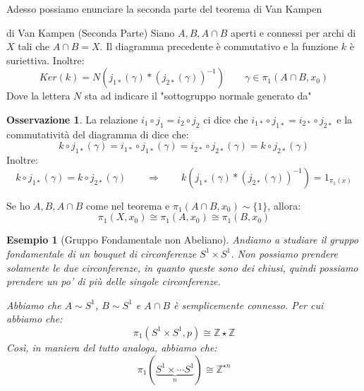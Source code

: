 \documentclass[11pt,a4paper,twoside]{article}
\newtheorem{es}{Esempio}
\theoremstyle{definition}
\newtheorem*{oss}{Osservazione}
\begin{document}
Adesso possiamo enunciare la seconda parte del teorema di Van Kampen

\begin{thm}{di Van Kampen (Seconda Parte)}{}\label{VK2}
	Siano $A,B,A\cap B$ aperti e connessi per archi di $X$ tali che $A \cap B = X$. Il diagramma precedente è commutativo e la funzione $k$ è suriettiva. Inoltre:
	\[ Ker(k) = N(j_{1*}(\gamma) * (j_{2*}(\gamma))^{-1})\qquad \gamma \in \pi_1(A \cap B, x_0) \]
	Dove la lettera $N$ sta ad indicare il "sottogruppo normale generato da"
\end{thm}

\begin{oss}
	La relazione $i_1\circ j_1 =i_2 \circ j_2$ ci dice che $i_{1*} \circ j_{1*} = i_{2*} \circ j_{2*}$ e la commutatività del diagramma di dice che:
	\[ k \circ j_{1*}(\gamma) = i_{1*} \circ j_{1*}(\gamma) = i_{2*} \circ j_{2*} (\gamma) = k \circ j_{2*}(\gamma) \]
	Inoltre:
	\[ k \circ j_{1*}(\gamma) = k \circ j_{2*}(\gamma) \qquad \Rightarrow \qquad k(j_{1*}(\gamma) * (j_{2*}(\gamma))^{-1}) = 1_{\pi_1(x)} \]
\end{oss}

\begin{cor}{}{}
	Se ho $A,B,A \cap B$ come nel teorema e $\pi_1(A \cap B, x_0) \sim \{1\}$, allora:
	\[ \pi_1(X, x_0) \cong \pi_1(A, x_0) \cong \pi_1(B, x_0) \]
\end{cor}

\begin{es}[Gruppo Fondamentale non Abeliano]
	Andiamo a studiare il gruppo fondamentale di un bouquet di circonferenze $S^1 \times S^1$. Non possiamo prendere solamente le due circonferenze, in quanto queste sono dei chiusi, quindi possiamo prendere un po' di più delle singole circonferenze.
	\begin{center}
	\end{center}
	Abbiamo che $A\sim S^1$, $B \sim S^1$ e $A \cap B$ è semplicemente connesso. Per cui abbiamo che:
	\[ \pi_1(S^1\times S^1,p) \cong \mathbb Z \star \mathbb Z \]
	Così, in maniera del tutto analoga, abbiamo che:
	\[ \pi_1(\underbrace{S^1\times \cdots S^1}_{n} ) \cong \mathbb Z^{\star n} \]
\end{es}
\end{document}
